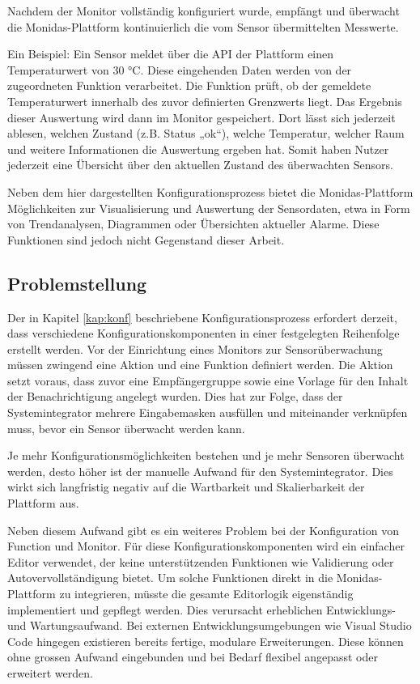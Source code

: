 \iffalse
\begin{figure}[H]
  \centering
  \texttt{[image: monitor1.png]}
  \caption{Benutzerfreundliche Eingabemaske für Endnutzer}
  \label{fig:monitor1}
\end{figure}
\fi


Nachdem der Monitor vollständig konfiguriert wurde, empfängt und überwacht die Monidas-Plattform kontinuierlich die vom Sensor übermittelten Messwerte. 

Ein Beispiel: Ein Sensor meldet über die API der Plattform einen Temperaturwert von 30 °C. Diese eingehenden Daten werden von der zugeordneten Funktion verarbeitet. Die Funktion prüft, ob der gemeldete Temperaturwert innerhalb des zuvor definierten Grenzwerts liegt. Das Ergebnis dieser Auswertung wird dann im Monitor gespeichert. Dort lässt sich jederzeit ablesen, welchen Zustand (z.B. Status „ok“), welche Temperatur, welcher Raum und weitere Informationen die Auswertung ergeben hat. Somit haben Nutzer jederzeit eine Übersicht über den aktuellen Zustand des überwachten Sensors.

Neben dem hier dargestellten Konfigurationsprozess bietet die Monidas-Plattform Möglichkeiten zur Visualisierung und Auswertung der Sensordaten, etwa in Form von Trendanalysen, Diagrammen oder Übersichten aktueller Alarme. Diese Funktionen sind jedoch nicht Gegenstand dieser Arbeit.

\subsection{Problemstellung}
\label{sec:problemstellung}
Der in Kapitel \ref{kap:konf} beschriebene Konfigurationsprozess erfordert derzeit, dass verschiedene Konfigurationskomponenten in einer festgelegten Reihenfolge erstellt werden. Vor der Einrichtung eines Monitors zur Sensorüberwachung müssen zwingend eine Aktion und eine Funktion definiert werden. Die Aktion setzt voraus, dass zuvor eine Empfängergruppe sowie eine Vorlage für den Inhalt der Benachrichtigung angelegt wurden. Dies hat zur Folge, dass der Systemintegrator mehrere Eingabemasken ausfüllen und miteinander verknüpfen muss, bevor ein Sensor überwacht werden kann.

Je mehr Konfigurationsmöglichkeiten bestehen und je mehr Sensoren überwacht werden, desto höher ist der manuelle Aufwand für den Systemintegrator. Dies wirkt sich langfristig negativ auf die Wartbarkeit und Skalierbarkeit der Plattform aus.


Neben diesem Aufwand gibt es ein weiteres Problem bei der Konfiguration von Function und Monitor. Für diese Konfigurationskomponenten wird ein einfacher Editor verwendet, der keine unterstützenden Funktionen wie Validierung oder Autovervollständigung bietet. Um solche Funktionen direkt in die Monidas-Plattform zu integrieren, müsste die gesamte Editorlogik eigenständig implementiert und gepflegt werden. Dies verursacht erheblichen Entwicklungs- und Wartungsaufwand. Bei externen Entwicklungsumgebungen wie Visual Studio Code hingegen existieren bereits fertige, modulare Erweiterungen. Diese können ohne grossen Aufwand eingebunden und bei Bedarf flexibel angepasst oder erweitert werden.

